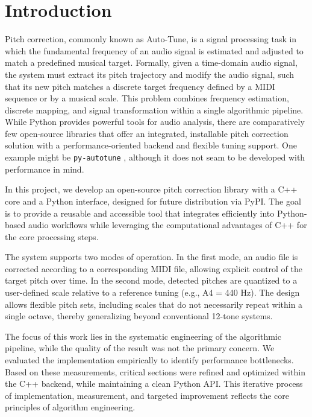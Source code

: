 \documentclass[sigconf]{acmart}
\begin{document}
    \let\thefootnote\relax{}


    \section{Introduction}
    Pitch correction, commonly known as Auto-Tune, is a signal processing task in which the fundamental frequency of an audio signal is estimated and adjusted to match a predefined musical target. Formally, given a time-domain audio signal, the system must extract its pitch trajectory and modify the audio signal, such that its new pitch matches a discrete target frequency defined by a MIDI sequence or by a musical scale. This problem combines frequency estimation, discrete mapping, and signal transformation within a single algorithmic pipeline. While Python provides powerful tools for audio analysis, there are comparatively few open-source libraries that offer an integrated, installable pitch correction solution with a performance-oriented backend and flexible tuning support. One example might be \texttt{py-autotune} \cite{py_autotune_pypi}, although it does not seam to be developed with performance in mind.

    In this project, we develop an open-source pitch correction library with a C++ core and a Python interface, designed for future distribution via PyPI. The goal is to provide a reusable and accessible tool that integrates efficiently into Python-based audio workflows while leveraging the computational advantages of C++ for the core processing steps.

    The system supports two modes of operation. In the first mode, an audio file is corrected according to a corresponding MIDI file, allowing explicit control of the target pitch over time. In the second mode, detected pitches are quantized to a user-defined scale relative to a reference tuning (e.g., A4 = 440 Hz). The design allows flexible pitch sets, including scales that do not necessarily repeat within a single octave, thereby generalizing beyond conventional 12-tone systems.

    The focus of this work lies in the systematic engineering of the algorithmic pipeline, while the quality of the result was not the primary concern. We evaluated the implementation empirically to identify performance bottlenecks. Based on these measurements, critical sections were refined and optimized within the C++ backend, while maintaining a clean Python API. This iterative process of implementation, measurement, and targeted improvement reflects the core principles of algorithm engineering.
\end{document}
